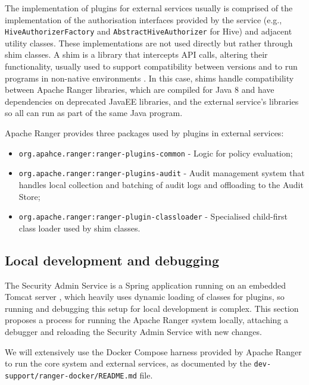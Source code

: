 The implementation of plugins for external services usually is comprised of the implementation of the authorisation interfaces provided by the service (e.g., \texttt{HiveAuthorizerFactory} and \texttt{AbstractHiveAuthorizer} for Hive) and adjacent utility classes. These implementations are not used directly but rather through shim classes. A shim is a library that intercepts API calls, altering their functionality, usually used to support compatibility between versions and to run programs in non-native environments \cite{shimsNewton2011}. In this case, shims handle compatibility between Apache Ranger libraries, which are compiled for Java 8 and have dependencies on deprecated JavaEE libraries, and the external service's libraries so all can run as part of the same Java program.

Apache Ranger provides three packages used by plugins in external services:

\begin{itemize}
    \item \texttt{org.apahce.ranger:ranger-plugins-common} - Logic for policy evaluation;
    \item \texttt{org.apache.ranger:ranger-plugins-audit} - Audit management system that handles local collection and batching of audit logs and offloading to the Audit Store;
    \item \texttt{org.apache.ranger:ranger-plugin-classloader} - Specialised child-first class loader used by shim classes.
\end{itemize}

\subsection{Local development and debugging}

The Security Admin Service is a Spring application \cite{springTech} running on an embedded Tomcat server \cite{apacheTomactTech}, which heavily uses dynamic loading of classes for plugins, so running and debugging this setup for local development is complex. This section proposes a process for running the Apache Ranger system locally, attaching a debugger and reloading the Security Admin Service with new changes.

We will extensively use the Docker Compose harness provided by Apache Ranger to run the core system and external services, as documented by the \texttt{dev-support/ranger-docker/README.md} file.

